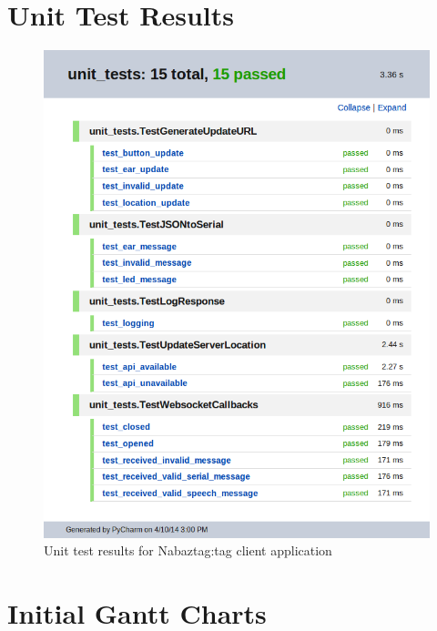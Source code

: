 \documentclass[12pt, a4paper]{article}
\begin{document}
\begin{appendices}
\section{Unit Test Results}\label{app:unittests}
	\begin{figure}[H] 
		\centerline{\includegraphics[scale=0.60]{images/unittests.png}}
		\caption[Unit test results for Nabaztag:tag client application]{Unit test results for Nabaztag:tag client application}
		\label{fig:unittests}
	\end{figure}

\newpage

\section{Initial Gantt Charts}\label{app:initialgantt}


\end{appendices}
\end{document}
